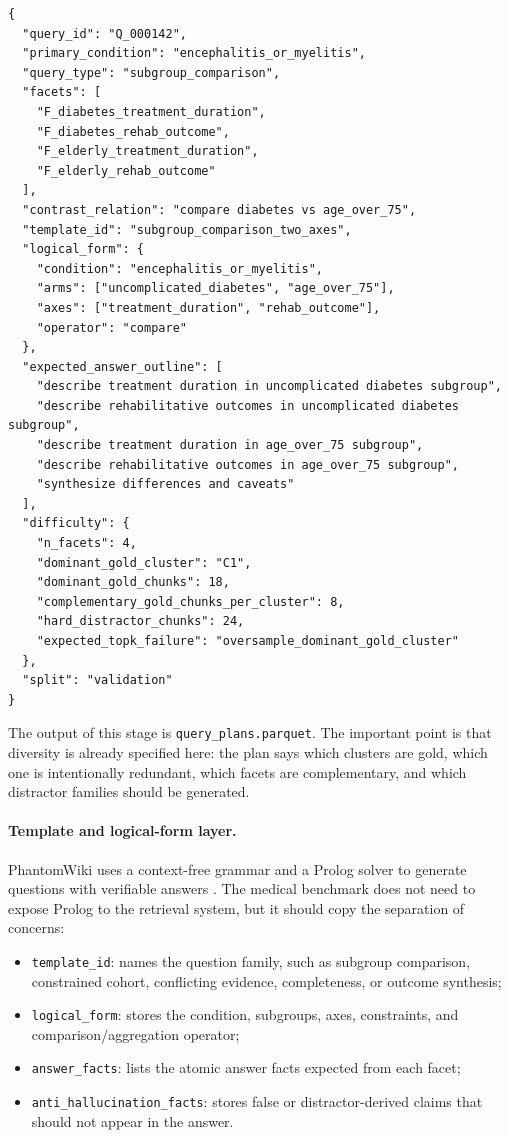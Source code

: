 \documentclass[11pt,a4paper]{article}
\newcommand{\field}[1]{\texttt{#1}}
\begin{document}
\begin{lstlisting}[style=promptstyle]
{
  "query_id": "Q_000142",
  "primary_condition": "encephalitis_or_myelitis",
  "query_type": "subgroup_comparison",
  "facets": [
    "F_diabetes_treatment_duration",
    "F_diabetes_rehab_outcome",
    "F_elderly_treatment_duration",
    "F_elderly_rehab_outcome"
  ],
  "contrast_relation": "compare diabetes vs age_over_75",
  "template_id": "subgroup_comparison_two_axes",
  "logical_form": {
    "condition": "encephalitis_or_myelitis",
    "arms": ["uncomplicated_diabetes", "age_over_75"],
    "axes": ["treatment_duration", "rehab_outcome"],
    "operator": "compare"
  },
  "expected_answer_outline": [
    "describe treatment duration in uncomplicated diabetes subgroup",
    "describe rehabilitative outcomes in uncomplicated diabetes subgroup",
    "describe treatment duration in age_over_75 subgroup",
    "describe rehabilitative outcomes in age_over_75 subgroup",
    "synthesize differences and caveats"
  ],
  "difficulty": {
    "n_facets": 4,
    "dominant_gold_cluster": "C1",
    "dominant_gold_chunks": 18,
    "complementary_gold_chunks_per_cluster": 8,
    "hard_distractor_chunks": 24,
    "expected_topk_failure": "oversample_dominant_gold_cluster"
  },
  "split": "validation"
}
\end{lstlisting}

The output of this stage is \field{query\_plans.parquet}. The important point is that diversity is already specified here: the plan says which clusters are gold, which one is intentionally redundant, which facets are complementary, and which distractor families should be generated.

\paragraph{Template and logical-form layer.}
PhantomWiki uses a context-free grammar and a Prolog solver to generate questions with verifiable answers \citep{gong2025phantomwiki}. The medical benchmark does not need to expose Prolog to the retrieval system, but it should copy the separation of concerns:

\begin{itemize}[leftmargin=*]
	\item \field{template\_id}: names the question family, such as subgroup comparison, constrained cohort, conflicting evidence, completeness, or outcome synthesis;
	\item \field{logical\_form}: stores the condition, subgroups, axes, constraints, and comparison/aggregation operator;
	\item \field{answer\_facts}: lists the atomic answer facts expected from each facet;
	\item \field{anti\_hallucination\_facts}: stores false or distractor-derived claims that should not appear in the answer.
\end{itemize}
\end{document}
